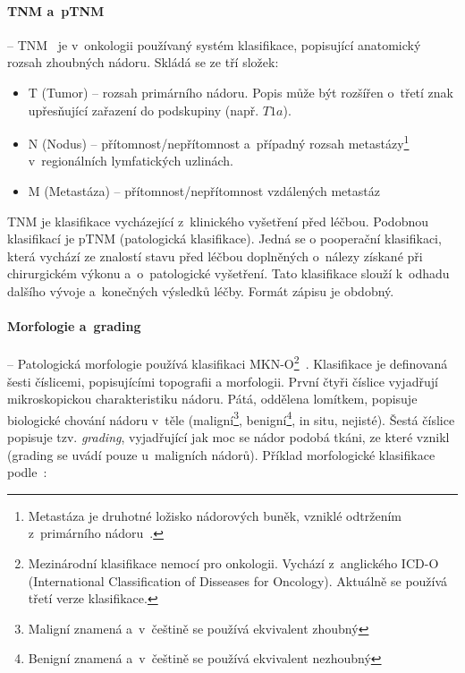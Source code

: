 \documentclass[11pt,draft,oneside]{fithesis2}
\begin{document}
\paragraph*{TNM a~pTNM} -- TNM~\cite{TNM} je v~onkologii používaný systém klasifikace, popisující anatomický rozsah zhoubných nádoru. Skládá se ze tří složek:
\begin{itemize}
	\item T (Tumor) -- rozsah primárního nádoru. Popis může být rozšířen o~třetí znak upřesňující zařazení do podskupiny (např. $T1a$).
	
	\item N (Nodus) -- přítomnost/nepřítomnost a~případný rozsah metastázy\footnote{Metastáza je druhotné ložisko nádorových buněk, vzniklé odtržením z~primárního nádoru~\cite{metastaza}.} v~regionálních lymfatických uzlinách.
	\item M (Metastáza) -- přítomnost/nepřítomnost vzdálených metastáz
\end{itemize}

TNM je klasifikace vycházející z~klinického vyšetření před léčbou. Podobnou klasifikací je pTNM (patologická klasifikace). Jedná se o pooperační klasifikaci, která vychází ze znalostí stavu před léčbou doplněných o~nálezy získané při chirurgickém výkonu a~o~patologické vyšetření. Tato klasifikace slouží k~odhadu dalšího vývoje a~konečných výsledků léčby. Formát zápisu je obdobný.

\paragraph*{Morfologie a~grading} --
Patologická morfologie používá klasifikaci MKN-O\footnote{Mezinárodní klasifikace nemocí pro onkologii. Vychází z~anglického ICD-O (International Classification of Disseases for Oncology). Aktuálně se používá třetí verze klasifikace.}~\cite{MKN-O}. Klasifikace je definovaná šesti číslicemi, popisujícími topografii a morfologii. První čtyři číslice vyjadřují mikroskopickou charakteristiku nádoru. Pátá, oddělena lomítkem, popisuje biologické chování nádoru v~těle (maligní\footnote{Maligní znamená  a~v~češtině se používá ekvivalent zhoubný}, benigní\footnote{Benigní znamená  a~v~češtině se používá ekvivalent nezhoubný}, in situ, nejisté). Šestá číslice popisuje tzv. \textit{grading}, vyjadřující jak moc se nádor podobá tkáni, ze které vznikl (grading se uvádí pouze u~maligních nádorů).  Příklad morfologické klasifikace podle~\cite{MKN-O}:
\end{document}
